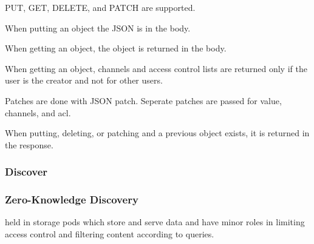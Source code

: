 PUT, GET, DELETE, and PATCH are supported.

When putting an object the JSON is in the body.

When getting an object, the object is returned in the body.



When getting an object, channels and access control lists are returned only
if the user is the creator and not for other users.

Patches are done with JSON patch. Seperate patches are passed for value, channels, and acl.

When putting, deleting, or patching and a previous object exists, it is
returned in the response.

\subsubsection{Discover}

\subsubsection{Zero-Knowledge Discovery}

held in storage pods which store and serve data and have minor roles in
limiting access control and filtering content according to queries.
